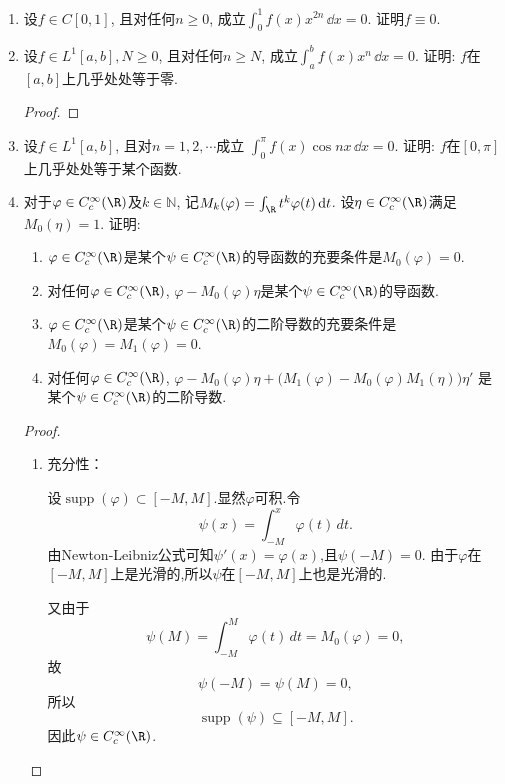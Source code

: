 \begin{quiza}
\begin{enumerate}
\item 设\(f\in C[0,1]\), 且对任何\(n\geqslant 0\), 
成立\(\int_{0}^{1}f(x)x^{2n}\,\dd x=0\). 证明\(f\equiv 0\).

\item 设\(f\in L^1[a,b],N\geqslant 0\), 且对任何\(n\geqslant N\), 
成立\(\int_{a}^{b}f(x)x^n\,\dd x=0\). 证明: \(f\)在\([a,b]\)上几乎处处等于零. 
\begin{proof}

\end{proof}

\item 设\(f\in L^1[a,b]\), 且对\(n=1,2,\cdots\)成立
\(\int_{0}^{\pi}f(x)\cos nx\,\dd x=0\). 
证明: \(f\)在\([0,\pi]\)上几乎处处等于某个函数.

\item 对于\(\varphi\in C_c^{\infty}(\R)\)及\(k\in\mathbb{N}\), 
记\(M_k(\varphi)=\int_{\R}t^k\varphi(t)\,\dd t\). 
设\(\eta\in C_c^{\infty}(\R)\)满足\(M_0(\eta)=1\). 证明:
\begin{enumerate}[label=(\roman*)]
\item \(\varphi\in C_c^{\infty}(\R)\)是某个\(\psi\in C_c^{\infty}(\R)\)的导函数的充要条件是\(M_0(\varphi)=0\).
\item 对任何\(\varphi\in C_c^{\infty}(\R)\), \(\varphi-M_0(\varphi)\eta\)是某个\(\psi\in C_c^{\infty}(\R)\)的导函数.
\item \(\varphi\in C_c^{\infty}(\R)\)是某个\(\psi\in C_c^{\infty}(\R)\)的二阶导数的充要条件是\(M_0(\varphi)=M_1(\varphi)=0\).
\item 对任何\(\varphi\in C_c^{\infty}(\R)\), \(\varphi-M_0(\varphi)\eta+\big(M_1(\varphi)-M_0(\varphi)M_1(\eta)\big)\eta'\)
是某个\(\psi\in C_c^{\infty}(\R)\)的二阶导数.
\end{enumerate}

\begin{proof}
   \begin{enumerate}[label=(\roman*)]
   \item 
   充分性：

   设$\operatorname{supp}(\varphi) \subset [-M,M]$.显然$\varphi$可积.令
   $$\psi(x) = \int_{-M}^x \varphi(t) \, dt.$$
   由Newton-Leibniz公式可知$\psi'(x) = \varphi(x)$,且$\psi(-M) = 0$.
   由于$\varphi$在$[-M,M]$上是光滑的,所以$\psi$在$[-M,M]$上也是光滑的.
   
   又由于$$\psi(M) = \int_{-M}^M \varphi(t) \, dt = M_0(\varphi) = 0,$$故$$\psi(-M)=\psi(M)=0,$$所以$$\operatorname{supp}(\psi)\subseteq [-M,M].$$因此$\psi \in C_c^{\infty}(\R)$.


\end{enumerate}
\end{proof}
\end{enumerate}
\end{quiza}
